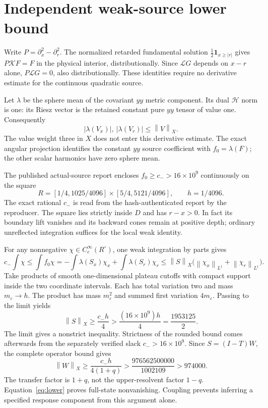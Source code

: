 \documentclass[11pt]{article}
\newcommand{\HH}{\mathcal H}
\newcommand{\KK}{\mathcal K}
\newcommand{\LL}{\mathcal L}
\newcommand{\norm}[1]{\left\lVert#1\right\rVert}
\begin{document}
\appendix
\section{Independent weak-source lower bound}\label{app:weak}
Write $P=\partial_x^2-\partial_r^2$. The normalized retarded fundamental
solution $\tfrac12\mathbf1_{x\ge|r|}$ gives $P\KK F=F$ in the physical
interior, distributionally. Since $\LL G$ depends on $x-r$ alone,
$P\LL G=0$, also distributionally. These identities require no derivative
estimate for the continuous quadratic source.

Let $\lambda$ be the sphere mean of the covariant $yy$ metric component.
Its dual $\HH$ norm is one: its Riesz vector is the retained constant pure
$yy$ tensor of value one. Consequently
\[
 |\lambda(V_x)|,\ |\lambda(V_r)|\le\norm{V}_X.
\]
The value weight three in $X$ does not enter this derivative estimate.
The exact angular projection identifies the constant $yy$ source coefficient
with $f_0=\lambda(F)$; the other scalar harmonics have zero sphere mean.

The published actual-source report encloses $f_0\ge c_->16\times10^9$
continuously on the square
\[
 R=[1/4,1025/4096]\times[5/4,5121/4096],\qquad h=1/4096.
\]
The exact rational $c_-$ is read from the hash-authenticated report by the
reproducer. The square lies strictly inside $D$ and has $r-x>0$. In fact its
boundary lift vanishes and its backward cones remain at positive depth;
ordinary unreflected integration suffices for the local weak identity.

For any nonnegative $\chi\in C_c^\infty(R^\circ)$, one weak integration
by parts gives
\[
 c_-\int\chi\le\int f_0\chi
 =-\int\lambda(S_x)\chi_x+\int\lambda(S_r)\chi_r
 \le\norm{S}_X\bigl(\norm{\chi_x}_{L^1}+\norm{\chi_r}_{L^1}\bigr).
\]
Take products of smooth one-dimensional plateau cutoffs with compact support
inside the two coordinate intervals. Each has total variation two and mass
$m_\varepsilon\to h$. The product has mass $m_\varepsilon^2$ and summed
first variation $4m_\varepsilon$. Passing to the limit yields
\[
 \norm{S}_X\ge\frac{c_-h}{4}>
 \frac{(16\times10^9)h}{4}=\frac{1953125}{2}.
\]
The limit gives a nonstrict inequality. Strictness of the rounded bound
comes afterwards from the separately verified slack $c_->16\times10^9$.
Since $S=(I-T)W$, the complete operator bound gives
\begin{equation}
 \boxed{\quad\norm{W}_X\ge\frac{c_-h}{4(1+q)}
       >\frac{976562500000}{1002109}>974000.\quad}       \label{eq:lower}
\end{equation}
The transfer factor is $1+q$, not the upper-resolvent factor $1-q$.
Equation~\eqref{eq:lower} proves full-state nonvanishing. Coupling prevents
inferring a specified response component from this argument alone.
\end{document}
